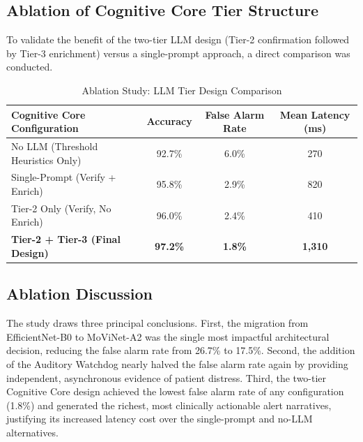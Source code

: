 \subsection{Ablation of Cognitive Core Tier Structure}

To validate the benefit of the two-tier LLM design (Tier-2 confirmation followed
by Tier-3 enrichment) versus a single-prompt approach, a direct comparison was
conducted.

\begin{table}[H]
    \centering
    \caption{Ablation Study: LLM Tier Design Comparison}
    \label{tab:ablation_llm}
    \renewcommand{\arraystretch}{1.3}
    \begin{tabular}{|p{5cm}|c|c|c|}
    \hline
    \textbf{Cognitive Core Configuration} & \textbf{Accuracy} & \textbf{False Alarm Rate} & \textbf{Mean Latency (ms)} \\ \hline
    No LLM (Threshold Heuristics Only) & 92.7\% & 6.0\% & 270 \\ \hline
    Single-Prompt (Verify + Enrich) & 95.8\% & 2.9\% & 820 \\ \hline
    Tier-2 Only (Verify, No Enrich) & 96.0\% & 2.4\% & 410 \\ \hline
    \textbf{Tier-2 + Tier-3 (Final Design)} & \textbf{97.2\%} & \textbf{1.8\%} & \textbf{1,310} \\ \hline
    \end{tabular}
\end{table}

\subsection{Ablation Discussion}

The study draws three principal conclusions. First, the migration from
EfficientNet-B0 to MoViNet-A2 was the single most impactful architectural
decision, reducing the false alarm rate from 26.7\% to 17.5\%. Second, the
addition of the Auditory Watchdog nearly halved the false alarm rate again by
providing independent, asynchronous evidence of patient distress. Third, the
two-tier Cognitive Core design achieved the lowest false alarm rate of any
configuration (1.8\%) and generated the richest, most clinically actionable
alert narratives, justifying its increased latency cost over the single-prompt
and no-LLM alternatives.
